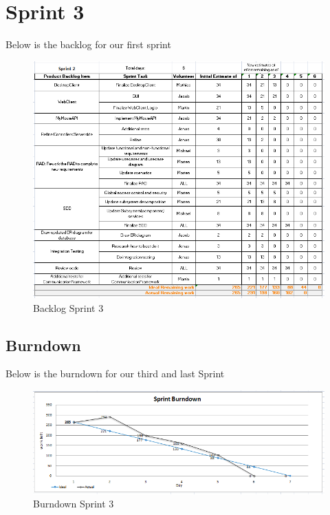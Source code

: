 \section{Sprint 3}
\label{chap:Spring 3}
Below is the backlog for our first sprint
\begin{figure}[h]
\includegraphics[scale=0.75]{img/SCRUM/backlogSprint3.png}
\caption{Backlog Sprint 3}
\label{fig:Backlog Sprint 3}
\end{figure}

\newpage
\subsection{Burndown}
Below is the burndown for our third and last Sprint
\begin{figure}[h]
\begin{center}
\includegraphics[scale=0.7]{img/SCRUM/burndownSprint3.png}
\caption{Burndown Sprint 3}
\label{fig:Burndown Sprint 3}
\end{center}
\end{figure}



